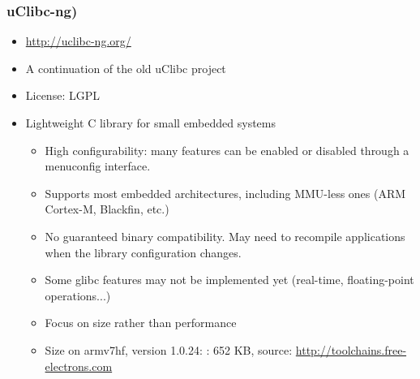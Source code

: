 \begin{frame}
  \frametitle{uClibc-ng)}
  \begin{itemize}
  \item \url{http://uclibc-ng.org/}
  \item A continuation of the old uClibc project
  \item License: LGPL
  \item Lightweight C library for small embedded systems
    \begin{itemize}
    \item High configurability: many features can be enabled or
      disabled through a menuconfig interface.
    \item Supports most embedded architectures, including MMU-less
          ones (ARM Cortex-M, Blackfin, etc.)
    \item No guaranteed binary compatibility. May need to
      recompile applications when the library configuration changes.
    \item Some glibc features may not be implemented yet (real-time,
          floating-point operations...)
    \item Focus on size rather than performance
    \item Size on armv7hf, version 1.0.24:
      : 652 KB, source: \url{http://toolchains.free-electrons.com}
    \end{itemize}
  \end{itemize}
\end{frame}

